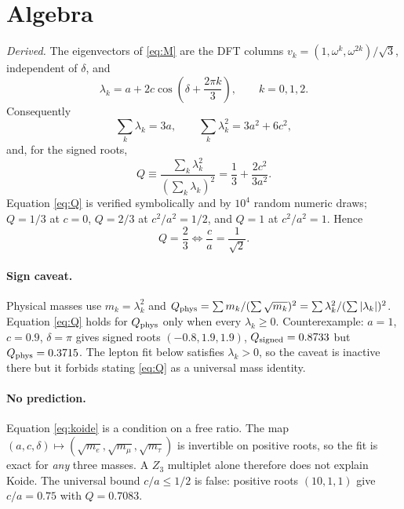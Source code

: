 \documentclass[11pt]{article}
\begin{document}
\section{Algebra}
\label{sec:algebra}

\emph{Derived.} The eigenvectors of \eqref{eq:M} are the DFT columns
$v_k=(1,\omega^k,\omega^{2k})/\sqrt3$, independent of $\delta$, and
\begin{equation}
\lambda_k=a+2c\cos\!\left(\delta+\frac{2\pi k}{3}\right),\qquad k=0,1,2.
\label{eq:eig}
\end{equation}
Consequently
\begin{equation}
\sum_k\lambda_k=3a,\qquad
\sum_k\lambda_k^2=3a^2+6c^2,
\end{equation}
and, for the signed roots,
\begin{equation}
Q\equiv\frac{\sum_k\lambda_k^2}{\left(\sum_k\lambda_k\right)^2}
=\frac13+\frac{2c^2}{3a^2}.
\label{eq:Q}
\end{equation}
Equation \eqref{eq:Q} is verified symbolically and by $10^4$ random numeric
draws; $Q=1/3$ at $c=0$, $Q=2/3$ at $c^2/a^2=1/2$, and $Q=1$ at $c^2/a^2=1$.
Hence
\begin{equation}
Q=\frac23 \iff \frac{c}{a}=\frac{1}{\sqrt2}.
\label{eq:koide}
\end{equation}

\paragraph{Sign caveat.} Physical masses use $m_k=\lambda_k^2$ and
$Q_{\rm phys}=\sum m_k/(\sum\sqrt{m_k})^2=\sum\lambda_k^2/(\sum|\lambda_k|)^2$.
Equation \eqref{eq:Q} holds for $Q_{\rm phys}$ only when every $\lambda_k\ge0$.
Counterexample: $a=1$, $c=0.9$, $\delta=\pi$ gives signed roots
$(-0.8,1.9,1.9)$, $Q_{\rm signed}=0.8733$ but $Q_{\rm phys}=0.3715$. The lepton
fit below satisfies $\lambda_k>0$, so the caveat is inactive there but it
forbids stating \eqref{eq:Q} as a universal mass identity.

\paragraph{No prediction.} Equation \eqref{eq:koide} is a condition on a free
ratio. The map $(a,c,\delta)\mapsto(\sqrt{m_e},\sqrt{m_\mu},\sqrt{m_\tau})$ is
invertible on positive roots, so the fit is exact for \emph{any} three masses.
A $Z_3$ multiplet alone therefore does not explain Koide. The universal bound
$c/a\le1/2$ is false: positive roots $(10,1,1)$ give $c/a=0.75$ with $Q=0.7083$.
\end{document}
